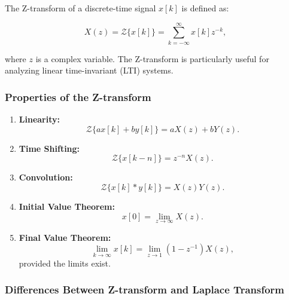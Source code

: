 \documentclass[a4 paper]{article}
\numberwithin{equation}{section}
\theoremstyle{boldStyle}
\theoremstyle{boldBlueStyle}
\theoremstyle{boldPurpleStyle}
\theoremstyle{boldRedStyle}
\theoremstyle{boldGreenStyle}
\begin{document}
The Z-transform of a discrete-time signal \( x[k] \) is defined as:

\[
X(z) = \mathcal{Z}\{x[k]\} = \sum_{k=-\infty}^{\infty} x[k] z^{-k},
\]

where \( z \) is a complex variable. The Z-transform is particularly useful for analyzing linear time-invariant (LTI) systems.

\subsubsection{Properties of the Z-transform}
\begin{enumerate}
  \item \textbf{Linearity:}
  \[
  \mathcal{Z}\{a x[k] + b y[k]\} = a X(z) + b Y(z).
  \]

  \item \textbf{Time Shifting:}
  \[
  \mathcal{Z}\{x[k-n]\} = z^{-n} X(z).
  \]

  \item \textbf{Convolution:}
  \[
  \mathcal{Z}\{x[k] * y[k]\} = X(z) Y(z).
  \]

  \item \textbf{Initial Value Theorem:}
  \[
  x[0] = \lim_{z \to \infty} X(z).
  \]

  \item \textbf{Final Value Theorem:}
  \[
  \lim_{k \to \infty} x[k] = \lim_{z \to 1} (1 - z^{-1}) X(z),
  \]
  provided the limits exist.
\end{enumerate}



\subsubsection{Differences Between Z-transform and Laplace Transform}
\end{document}
